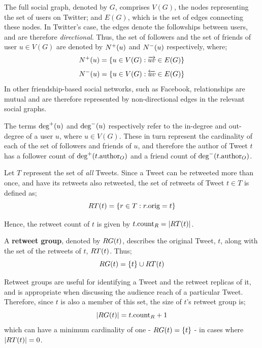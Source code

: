 The full social graph, denoted by $G$, comprises $V(G)$, the nodes representing the set of users on Twitter; and $E(G)$, which is the set of edges connecting these nodes. In Twitter's case, the edges denote the followships between users, and are therefore \textit{directional}. Thus, the set of followers and the set of friends of user $u \in V(G)$ are denoted by $N^+(u)$ and $N^-(u)$ respectively, where;
\[
    N^+(u) = \left\{u \in V(G) :  \overrightarrow{u v} \in E(G)\right\}
\]
\[
    N^-(u) = \left\{u \in V(G) :  \overleftarrow{u v} \in E(G)\right\}
\]
In other friendship-based social networks, such as Facebook, relationships are mutual and are therefore represented by non-directional edges in the relevant social graphs.

The terms $\textrm{deg}^+(u)$ and $\textrm{deg}^-(u)$ respectively refer to the in-degree and out-degree of a user $u$, where $u \in V(G)$. These in turn represent the cardinality of each of the set of followers and friends of $u$, and therefore the author of Tweet $t$ has a follower count of $\textrm{deg}^+(t.\textrm{author}_O)$ and a friend count of $\textrm{deg}^-(t.\textrm{author}_O)$.

Let $T$ represent the set of \textit{all} Tweets. Since a Tweet can be retweeted more than once, and have its retweets also retweeted, the set of retweets of Tweet $t \in T$ is defined as;
\[
    RT(t) = \left\{ r \in T : r.\textrm{orig} = t \right\}
\]

Hence, the retweet count of $t$ is given by $ t.\textrm{count}_R = \left\vert{RT(t)}\right\vert $.


\begin{mydefinition}
\label{definition:retweet_group}
A \textbf{retweet group}, denoted by $RG(t)$, describes the original Tweet, $t$, along with the set of the retweets of $t$, $RT(t)$. Thus;
\[
    RG(t) = \left\{t\right\} \cup RT(t)
\]
\end{mydefinition}


Retweet groups are useful for identifying a Tweet and the retweet replicas of it, and is appropriate when discussing the audience reach of a particular Tweet. Therefore, since $t$ is also a member of this set, the size of $t$'s retweet group is; 
\[
	\left\vert{
RG(t)}\right\vert = t.\textrm{count}_R + 1 
\] 
which can have a minimum cardinality of one - $RG(t) = \left\{t\right\}$ - in cases where $|RT(t)| = 0$.
 

